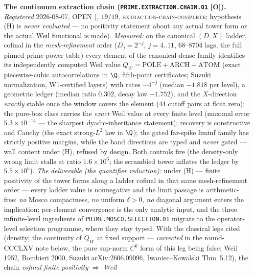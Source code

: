 \par\smallskip\noindent\textbf{The continuum extraction chain
(\texttt{PRIME.EXTRACTION.CHAIN.01} [O]).}
{\sloppy
\emph{Registered} 2026-08-07, OPEN
(, $19/19$,
\textsc{extraction-chain-complete}; hypothesis (H) is \emph{never
evaluated} --- no positivity statement about any actual tower
form or the actual Weil functional is made).  \emph{Measured:} on
the canonical $(D, X)$ ladder, cofinal in the
\emph{mesh-refinement} order ($D_j = 2^{-j}$,
$j = 4..11$, $68$--$8704$ lags, the full pinned prime-power
table) every element of the canonical dense family identifies its
independently computed Weil value $Q_W = \mathrm{POLE} +
\mathrm{ARCH} + \mathrm{ATOM}$ (exact piecewise-cubic
autocorrelations in $\Q$, fifth-point certificates; Suzuki
normalization, W1-certified layers) with rates ${\sim}4^{-j}$
(median $-1.818$ per level), a geometric ledger (median ratio
$0.302$, decay law $-1.752$), and the $X$-direction \emph{exactly}
stable once the window covers the element ($44$ cutoff pairs at
float zero); the pure-box class carries the \emph{exact} Weil
value at every finite level (maximal error $5.3\times10^{-14}$
--- the sharpest dyadic-inheritance statement); recovery is
constructive and Cauchy (the exact strong-$L^2$ law in $\Q$);
the gated far-spike liminf family has strictly positive margins,
while the band directions are typed and \emph{never} gated ---
wall content under (H), refused by design.  Both controls fire
(the density-only wrong limit stalls at ratio $1.6\times10^6$;
the scrambled tower inflates the ledger by $5.5\times10^5$).
\emph{The deliverable (the quantifier reduction):} under (H) ---
finite positivity of the tower forms along a ladder cofinal in
that same mesh-refinement order --- every ladder
value is nonnegative and the limit passage is arithmetic-free:
\emph{no} Mosco compactness, \emph{no} uniform $\delta > 0$,
\emph{no} diagonal argument enters the implication; per-element
convergence is the only analytic input, and the three
infinite-level ingredients of \texttt{PRIME.MOSCO.SELECTION.01}
migrate to the operator-level selection programme, where they
stay typed.  With the classical legs cited (density; the
continuity of $Q_W$ at fixed support --- \emph{corrected} in the
round-CCCLXV note below, the pure sup-norm $C^0$ form of this
leg being false; Weil 1952, Bombieri
2000, Suzuki arXiv:2606.09096, Iwaniec--Kowalski Thm~5.12), the
chain \emph{cofinal finite positivity} $\Rightarrow$ \emph{Weil
}}
